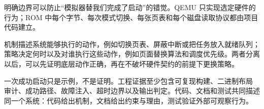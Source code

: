 明确边界可以防止“模拟器替我们完成了启动”的错觉。QEMU 只实现选定硬件的
行为；ROM 中每个字节、每次模式切换、每张页表和每个磁盘读取协议都由项目
代码建立。

机制描述系统能够执行的动作，例如切换页表、屏蔽中断或把任务放入就绪队列；
策略决定何时以及对谁执行这些动作，例如页面替换算法和调度优先级。两者分离
以后，可以先证明底层动作正确，再在不破坏硬件契约的前提下更换策略。

一次成功启动只是示例，不是证明。工程证据至少包含可复现构建、二进制布局
审计、成功路径、故障注入、超时边界以及输出判定。代码、文档和测试共同描述
同一个系统：代码给出机制，文档给出约束与理由，测试验证外部可观察行为。
